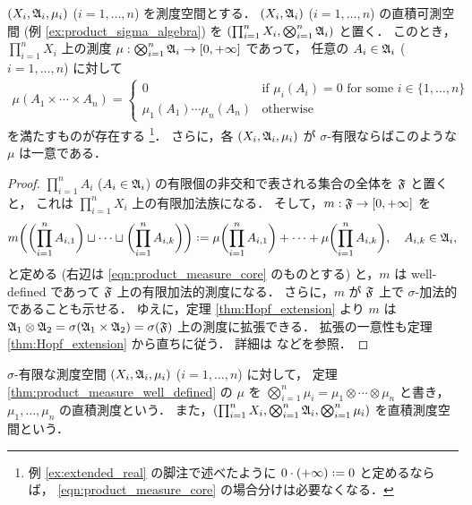 \begin{theorem}\label{thm:product_measure_well_defined}
    $(X_i,\mathfrak{A}_i,\mu_i)$ ($i=1,\ldots,n$) を測度空間とする．
    $(X_i,\mathfrak{A}_i)$ ($i=1,\ldots,n$) の直積可測空間 (例 \ref{ex:product_sigma_algebra}) を $(\prod_{i=1}^nX_i,\bigotimes_{i=1}^n\mathfrak{A}_i)$ と置く．
    このとき，$\prod_{i=1}^nX_i$ 上の測度 $\mu:\bigotimes_{i=1}^n\mathfrak{A}_i\to[0,+\infty]$ であって，
    任意の $A_i\in\mathfrak{A}_i$ ($i=1,\ldots,n$) に対して
    \begin{align}
        \mu(A_1\times\cdots\times A_n)=\begin{cases}
            0&\text{if $\mu_i(A_i)=0$ for some $i\in\{1,\ldots,n\}$}\\
            \mu_1(A_1)\cdots\mu_n(A_n)&\text{otherwise}
        \end{cases}
        \label{eqn:product_measure_core}
    \end{align}
    を満たすものが存在する
    \footnote{例 \ref{ex:extended_real} の脚注で述べたように $0\cdot(+\infty)\defeq0$ と定めるならば，
    \eqref{eqn:product_measure_core} の場合分けは必要なくなる．}．
    さらに，各 $(X_i,\mathfrak{A}_i,\mu_i)$ が $\sigma$-有限ならばこのような $\mu$ は一意である．
\end{theorem}

\begin{proof}
    $\prod_{i=1}^nA_i$ ($A_i\in\mathfrak{A}_i$) の有限個の非交和で表される集合の全体を $\mathfrak{F}$ と置くと，
    これは $\prod_{i=1}^nX_i$ 上の有限加法族になる．
    そして，$m:\mathfrak{F}\to[0,+\infty]$ を
    \begin{align*}
        m\biggl(\biggl(\prod_{i=1}^nA_{i,1}\biggr)\sqcup\cdots\sqcup\biggl(\prod_{i=1}^nA_{i,k}\biggr)\biggr)
        \defeq\mu\biggl(\prod_{i=1}^nA_{i,1}\biggr)+\cdots+\mu\biggl(\prod_{i=1}^nA_{i,k}\biggr),\quad
        A_{i,k}\in\Afrak_i,
    \end{align*}
    と定める (右辺は \eqref{eqn:product_measure_core} のものとする) と，$m$ は well-defined であって
    $\mathfrak{F}$ 上の有限加法的測度になる．
    さらに，$m$ が $\mathfrak{F}$ 上で $\sigma$-加法的であることも示せる．
    ゆえに，定理 \ref{thm:Hopf_extension} より $m$ は
    $\mathfrak{A}_1\otimes\mathfrak{A}_2=\sigma(\mathfrak{A}_1\times\mathfrak{A}_2)=\sigma(\mathfrak{F})$ 上の測度に拡張できる．
    拡張の一意性も定理 \ref{thm:Hopf_extension} から直ちに従う．
    詳細は \cite[\S2.5]{Fo99} などを参照．
\end{proof}

\begin{definition}\label{def:product_measure}
    $\sigma$-有限な測度空間 $(X_i,\mathfrak{A}_i,\mu_i)$ ($i=1,\ldots,n$) に対して，
    定理 \ref{thm:product_measure_well_defined} の $\mu$ を $\bigotimes_{i=1}^n\mu_i=\mu_1\otimes\cdots\otimes\mu_n$ と書き，
    $\mu_1,\ldots,\mu_n$ の直積測度という．
    また，$(\prod_{i=1}^nX_i,\bigotimes_{i=1}^n\mathfrak{A}_i,\bigotimes_{i=1}^n\mu_i)$ を直積測度空間という．
\end{definition}

